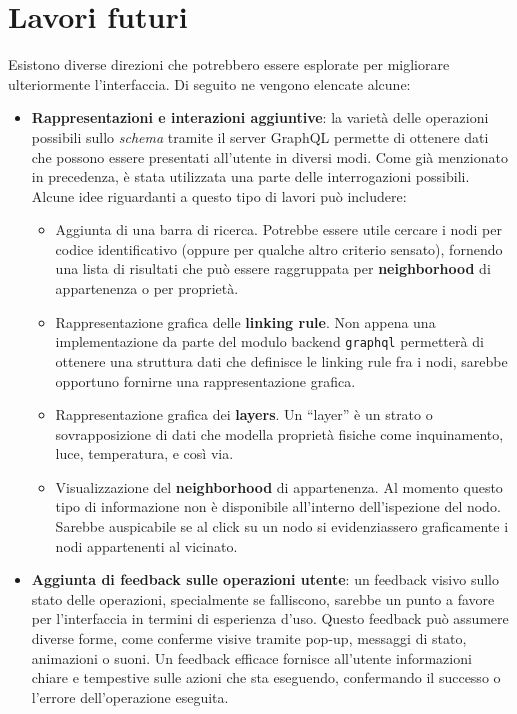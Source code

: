 \section{Lavori futuri}
Esistono diverse direzioni che potrebbero essere esplorate per migliorare ulteriormente l'interfaccia. Di seguito ne vengono elencate alcune:

\begin{itemize}
	\item \textbf{Rappresentazioni e interazioni aggiuntive}: la varietà delle operazioni possibili sullo \textit{schema} tramite il server GraphQL permette di ottenere dati che possono essere presentati all'utente in diversi modi. Come già menzionato in precedenza, è stata utilizzata una parte delle interrogazioni possibili. Alcune idee riguardanti a questo tipo di lavori può includere:
	\begin{itemize}
		\item Aggiunta di una barra di ricerca. Potrebbe essere utile cercare i nodi per codice identificativo (oppure per qualche altro criterio sensato), fornendo una lista di risultati che può essere raggruppata per \textbf{neighborhood} di appartenenza o per proprietà. \label{item:research-bar}
		\item Rappresentazione grafica delle \textbf{linking rule}. Non appena una implementazione da parte del modulo backend \texttt{graphql} permetterà di ottenere una struttura dati che definisce le linking rule fra i nodi, sarebbe opportuno fornirne una rappresentazione grafica. 
		\item Rappresentazione grafica dei \textbf{layers}. Un ``layer'' è un strato o sovrapposizione di dati che modella proprietà fisiche come inquinamento, luce, temperatura, e così via. 
		\item Visualizzazione del \textbf{neighborhood} di appartenenza. Al momento questo tipo di informazione non è disponibile all'interno dell'ispezione del nodo. Sarebbe auspicabile se al click su un nodo si evidenziassero graficamente i nodi appartenenti al vicinato.
	\end{itemize}
	\item \textbf{Aggiunta di feedback sulle operazioni utente}: un feedback visivo sullo stato delle operazioni, specialmente se falliscono, sarebbe un punto a favore per l'interfaccia in termini di esperienza d'uso. Questo feedback può assumere diverse forme, come conferme visive tramite pop-up, messaggi di stato, animazioni o suoni. Un feedback efficace fornisce all'utente informazioni chiare e tempestive sulle azioni che sta eseguendo, confermando il successo o l'errore dell'operazione eseguita.

\end{itemize}

